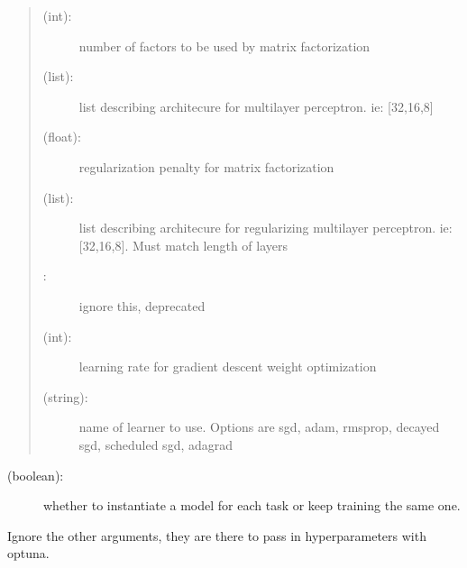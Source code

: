 \documentclass[letterpaper,10pt,english,openany,oneside]{sphinxmanual}
\begin{document}
\begin{fulllineitems}
\begin{description}
\begin{description}
\begin{quote}
\begin{description}
\item[{ (int):}] \leavevmode
number of factors to be used by matrix factorization

\item[{ (list):}] \leavevmode
list describing architecure for multilayer perceptron. ie: {[}32,16,8{]}

\item[{ (float):}] \leavevmode
regularization penalty for matrix factorization

\item[{ (list):}] \leavevmode
list describing architecure for regularizing multilayer perceptron. ie: {[}32,16,8{]}. Must match length of layers

\item[{ :}] \leavevmode
ignore this, deprecated

\item[{ (int):}] \leavevmode
learning rate for gradient descent weight optimization

\item[{ (string):}] \leavevmode
name of learner to use. Options are sgd, adam, rmsprop, decayed sgd, scheduled sgd, adagrad

\end{description}
\end{quote}
\begin{description}
\item[{ (boolean):}] \leavevmode
whether to instantiate a model for each task or keep training the same one.

\end{description}

\end{description}

Ignore the other arguments, they are there to pass in hyperparameters with optuna.

\end{description}

\end{fulllineitems}

\end{document}
